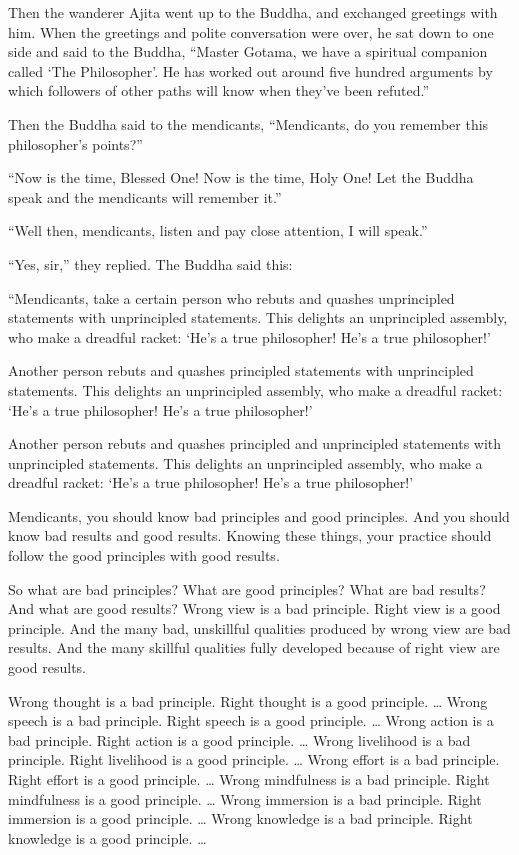 \documentclass[12pt,openany]{book}%
\begin{document}
Then the wanderer Ajita went up to the Buddha, and exchanged greetings with him. When the greetings and polite conversation were over, he sat down to one side and said to the Buddha, “Master Gotama, we have a spiritual companion called ‘The Philosopher’. He has worked out around five hundred arguments by which followers of other paths will know when they’ve been refuted.” 

Then the Buddha said to the mendicants, “Mendicants, do you remember this philosopher’s points?” 

“Now is the time, Blessed One! Now is the time, Holy One! Let the Buddha speak and the mendicants will remember it.” 

“Well then, mendicants, listen and pay close attention, I will speak.” 

“Yes, sir,” they replied. The Buddha said this: 

“Mendicants, take a certain person who rebuts and quashes unprincipled statements with unprincipled statements. This delights an unprincipled assembly, who make a dreadful racket: ‘He’s a true philosopher! He’s a true philosopher!’ 

Another person rebuts and quashes principled statements with unprincipled statements. This delights an unprincipled assembly, who make a dreadful racket: ‘He’s a true philosopher! He’s a true philosopher!’ 

Another person rebuts and quashes principled and unprincipled statements with unprincipled statements. This delights an unprincipled assembly, who make a dreadful racket: ‘He’s a true philosopher! He’s a true philosopher!’ 

Mendicants, you should know bad principles and good principles. And you should know bad results and good results. Knowing these things, your practice should follow the good principles with good results. 

So what are bad principles? What are good principles? What are bad results? And what are good results? Wrong view is a bad principle. Right view is a good principle. And the many bad, unskillful qualities produced by wrong view are bad results. And the many skillful qualities fully developed because of right view are good results. 

Wrong thought is a bad principle. Right thought is a good principle. … Wrong speech is a bad principle. Right speech is a good principle. … Wrong action is a bad principle. Right action is a good principle. … Wrong livelihood is a bad principle. Right livelihood is a good principle. … Wrong effort is a bad principle. Right effort is a good principle. … Wrong mindfulness is a bad principle. Right mindfulness is a good principle. … Wrong immersion is a bad principle. Right immersion is a good principle. … Wrong knowledge is a bad principle. Right knowledge is a good principle. … 
\end{document}
